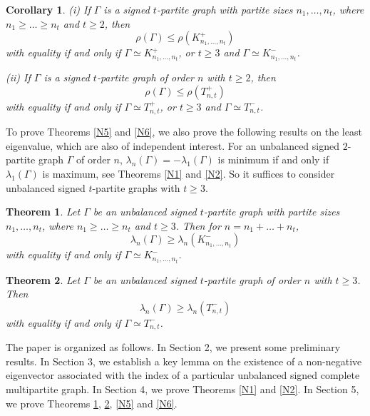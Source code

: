 \documentclass[12pt]{article}
\numberwithin{equation}{section}
\newtheorem {Theorem} {Theorem}[section]
\newtheorem {Corollary}{Corollary}[section]
\begin{document}
\begin{Corollary}\label{N51}
(i) If  $\Gamma$ is a signed $t$-partite graph with partite sizes $n_1, \dots, n_t$, where $n_1\ge \dots\ge n_t$ and $t\ge 2$, then
\[
\rho(\Gamma)\le \rho (K_{n_1, \dots, n_t}^+)
\]
with equality if and only if $\Gamma\simeq K_{n_1, \dots, n_t}^+$, or $t\ge 3$ and $\Gamma\simeq K_{n_1, \dots, n_t}^-$.

(ii) If $\Gamma$ is a signed $t$-partite graph of order $n$ with $t\ge 2$, then
\[
\rho(\Gamma)\le \rho(T_{n,t}^+)
\]
with equality if and only if $\Gamma\simeq T_{n,t}^+$, or $t\ge 3$ and $\Gamma\simeq
T_{n, t}^-$.
\end{Corollary}








To prove Theorems \ref{N5} and \ref{N6}, we also prove the following results on the least eigenvalue, which are also of independent  interest. 
For an unbalanced signed $2$-partite graph $\Gamma$ of order $n$,  $\lambda_n(\Gamma)=-\lambda_1(\Gamma)$ is minimum if and only if $\lambda_1(\Gamma)$ is maximum, see Theorems \ref{N1} and \ref{N2}. So it suffices to consider unbalanced signed $t$-partite graphs with $t\ge 3$.

 

\begin{Theorem}\label{N3}
Let $\Gamma$ be an unbalanced signed $t$-partite graph with partite sizes $n_1, \dots, n_t$, where $n_1\ge \dots\ge n_t$ and $t\ge 3$. Then for $n=n_1+\dots+n_t$, 
	\[
	\lambda_n(\Gamma)\ge \lambda_n (K_{n_1, \dots, n_t}^-)
	\]
	with equality if and only if $\Gamma\simeq K_{n_1, \dots, n_t}^-$.
\end{Theorem}

\begin{Theorem}\label{N4}
Let $\Gamma$ be an unbalanced signed $t$-partite graph of order $n$ with $t\ge 3$. Then
\[
\lambda_n(\Gamma)\ge \lambda_n (T_{n, t}^-)
\]
with equality if and only if $\Gamma\simeq T_{n, t}^-$.
\end{Theorem}


The paper is organized as follows. In Section 2, we present some preliminary results. In Section 3, we establish a key  lemma on the existence of a non-negative eigenvector associated with the index of a particular unbalanced signed complete multipartite graph. In Section 4, we prove Theorems \ref{N1} and \ref{N2}. In Section 5, we prove Theorems \ref{N3}, \ref{N4}, \ref{N5} and \ref{N6}.
\end{document}
